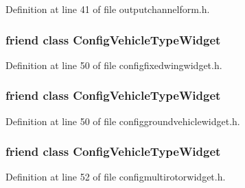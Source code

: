 Definition at line 41 of file outputchannelform.\-h.

\hypertarget{group___config_plugin_gaf1f904d5df6619518f3228b2d5d238d0}{
\subsubsection[{Config\-Vehicle\-Type\-Widget}]{\setlength{\rightskip}{0pt plus 5cm}friend class {\bf Config\-Vehicle\-Type\-Widget}\hspace{0.3cm}{\ttfamily [friend]}}}\label{group___config_plugin_gaf1f904d5df6619518f3228b2d5d238d0}


Definition at line 50 of file configfixedwingwidget.\-h.

\hypertarget{group___config_plugin_gaf1f904d5df6619518f3228b2d5d238d0}{
\subsubsection[{Config\-Vehicle\-Type\-Widget}]{\setlength{\rightskip}{0pt plus 5cm}friend class {\bf Config\-Vehicle\-Type\-Widget}\hspace{0.3cm}{\ttfamily [friend]}}}\label{group___config_plugin_gaf1f904d5df6619518f3228b2d5d238d0}


Definition at line 50 of file configgroundvehiclewidget.\-h.

\hypertarget{group___config_plugin_gaf1f904d5df6619518f3228b2d5d238d0}{
\subsubsection[{Config\-Vehicle\-Type\-Widget}]{\setlength{\rightskip}{0pt plus 5cm}friend class {\bf Config\-Vehicle\-Type\-Widget}\hspace{0.3cm}{\ttfamily [friend]}}}\label{group___config_plugin_gaf1f904d5df6619518f3228b2d5d238d0}


Definition at line 52 of file configmultirotorwidget.\-h.

